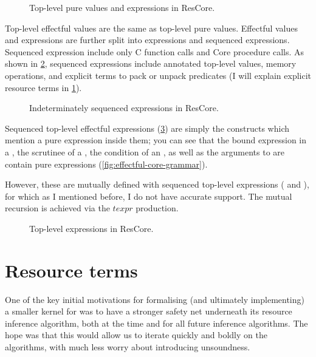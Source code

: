 \begin{figure}
    \small
    \grammartabularSTY{%
        \cntpval{}\cninterrule{}
        \cntpexpr{}\cnafterlastrule{}
    }
    \caption{Top-level pure values and expressions in ResCore.}\label{fig:kernel-tp}
\end{figure}

Top-level effectful values are the same as top-level pure values.
Effectful values and expressions are further split into 
expressions and  sequenced expressions. Sequenced
expression include only C function calls and Core procedure calls.
As shown in \cref{fig:kernel-is-expr},  sequenced
expressions include annotated top-level values, memory operations, and explicit
terms to pack or unpack predicates (I will explain explicit resource terms in
\cref{sec:res-terms}).

\begin{figure}[h]
    \small
    \grammartabularSTY{%
        \cnisXXexpr{}\cnafterlastrule{}
    }
    \caption{Indeterminately sequenced expressions in ResCore.}\label{fig:kernel-is-expr}
\end{figure}

Sequenced top-level effectful expressions (\cref{fig:kernel-texpr}) are
simply the constructs which mention a pure expression inside them; you can see
that the bound expression in a , the scrutinee of a
, the condition of an , as well as the
arguments to  are contain pure expressions
(\cref{fig:effectful-core-grammar}).

However, these are mutually defined with  sequenced
top-level expressions ( and ), for
which as I mentioned before, I do not have accurate support. The mutual
recursion is achieved via the $\mathit{texpr}$ production.

\begin{figure}[tp]
    \small
    \grammartabularSTY{%
        \cnseqXXtexpr{}\cninterrule{}
        \cntexpr{}\cnafterlastrule{}
    }
    \caption{Top-level expressions in ResCore.}\label{fig:kernel-texpr}
\end{figure}

\section{Resource terms}\label{sec:res-terms}

One of the key initial motivations for formalising (and ultimately
implementing) a smaller kernel for  was to have a stronger safety net
underneath its resource inference algorithm, both at the time and for all
future inference algorithms. The hope was that this would allow us to iterate
quickly and boldly on the algorithms, with much less worry about introducing
unsoundness.

